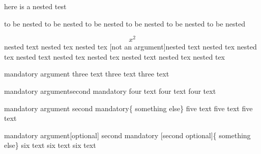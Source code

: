 here is a nested test
\begin{one}
	to be nested to be nested
	to be nested to be nested
	to be nested to be nested
	\begin{two}
		\[ x^2\]
		nested text nested tex nested tex [not an argument]nested text nested tex nested tex
		nested text nested tex nested tex
		nested text nested tex nested tex
	\end{two}
\end{one}
\begin{three}{mandatory argument}
	three text
	three text
	three text
\end{three}
\begin{four}{mandatory argument}{second mandatory}
	four text
	four text
	four text
\end{four}
\begin{five}[optional] {mandatory argument} {second mandatory}\{ something else\}
	five text
	five text
	five text
\end{five}
\begin{six} {mandatory argument}[optional] {second mandatory}    [second optional]\{ something else\}
	six text
	six text
	six text
\end{six}
